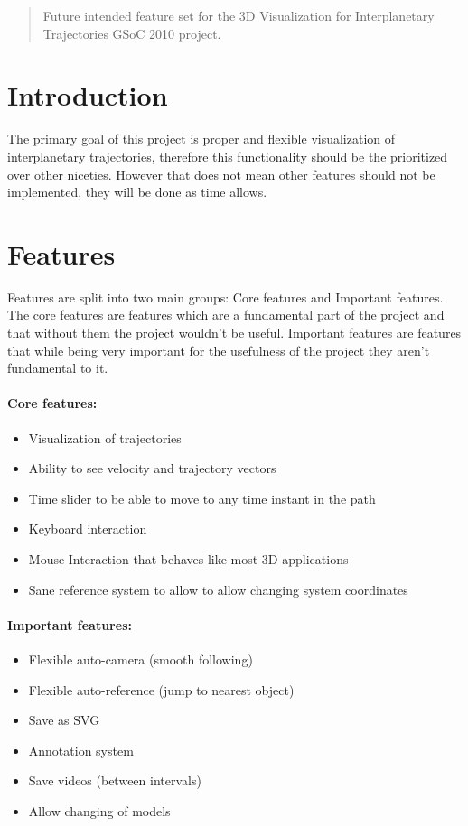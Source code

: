 \documentclass[12pt]{article}
\begin{document}
\maketitle

\begin{abstract}
Future intended feature set for the 3D Visualization for Interplanetary Trajectories GSoC 2010 project.
\end{abstract}

\section{Introduction}
The primary goal of this project is proper and flexible visualization of interplanetary trajectories, therefore this functionality should be the prioritized over other niceties. However that does not mean other features should not be implemented, they will be done as time allows.

\section{Features}

Features are split into two main groups: Core features and Important features. The core features are features which are a fundamental part of the project and that without them the project wouldn't be useful. Important features are features that while being very important for the usefulness of the project they aren't fundamental to it.

\paragraph{Core features:}
\begin{itemize}
\item Visualization of trajectories
\item Ability to see velocity and trajectory vectors
\item Time slider to be able to move to any time instant in the path
\item Keyboard interaction
\item Mouse Interaction that behaves like most 3D applications
\item Sane reference system to allow to allow changing system coordinates
\end{itemize}

\paragraph{Important features:}
\begin{itemize}
\item Flexible auto-camera (smooth following)
\item Flexible auto-reference (jump to nearest object)
\item Save as SVG
\item Annotation system
\item Save videos (between intervals)
\item Allow changing of models
\end{itemize}
\end{document}
